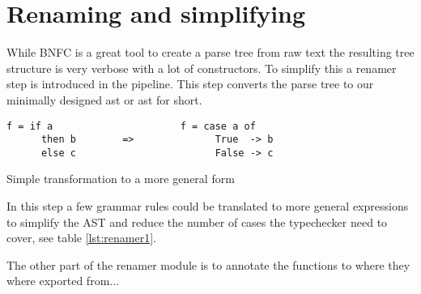 \section{Renaming and simplifying}


While BNFC is a great tool to create a parse tree from raw text the resulting 
tree structure is very verbose with a lot of constructors. To simplify this a
renamer step is introduced in the pipeline. This step converts the parse tree
to our minimally designed \acrlong{ast} or \acrshort{ast} for short. 

\begin{table}
\begin{lstlisting} 
f = if a                      f = case a of
      then b        =>              True  -> b
      else c                        False -> c
\end{lstlisting}
\caption{Simple transformation to a more general form}
\label{lst:renamer1}
\end{table}

In this step a few grammar rules could be translated to more general expressions
to simplify the AST and reduce the number of cases the typechecker need to cover, see
table \ref{lst:renamer1}.

The other part of the renamer module is to annotate the functions to where they
where exported from...
